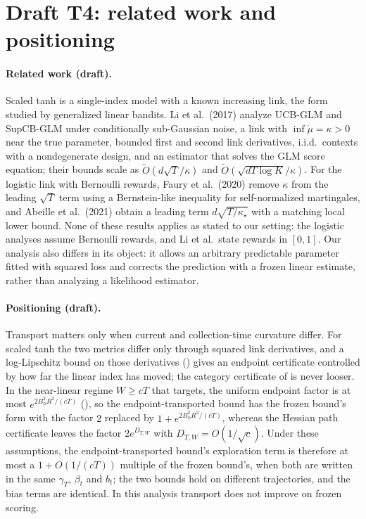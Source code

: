 \section*{Draft T4: related work and positioning}

\paragraph{Related work (draft).}
Scaled tanh is a single-index model with a known increasing link, the form
studied by generalized linear bandits. Li et al.\ (2017) analyze UCB-GLM and
SupCB-GLM under conditionally sub-Gaussian noise, a link with
$\inf\dot\mu=\kappa>0$ near the true parameter, bounded first and second link
derivatives, i.i.d.\ contexts with a nondegenerate design, and an estimator
that solves the GLM score equation; their bounds scale as
$\tilde O(d\sqrt T/\kappa)$ and $\tilde O(\sqrt{dT\log K}/\kappa)$. For the logistic
link with Bernoulli rewards, Faury et al.\ (2020) remove $\kappa$ from the
leading $\sqrt T$ term using a Bernstein-like inequality for self-normalized
martingales, and Abeille et al.\ (2021) obtain a leading term
$d\sqrt{T/\kappa_\star}$ with a matching local lower bound. None of these
results applies as stated to our setting: the logistic analyses assume
Bernoulli rewards, and Li et al.\ state rewards in $[0,1]$. Our
analysis also differs in its object: it allows an arbitrary predictable
parameter fitted with squared loss and corrects the prediction with a frozen
linear estimate, rather than analyzing a likelihood estimator.

\paragraph{Positioning (draft).}
Transport matters only when current and collection-time curvature differ. For
scaled tanh the two metrics differ only through squared link derivatives, and
a log-Lipschitz bound on those derivatives
() gives an endpoint certificate controlled by
how far the linear index has moved; the category certificate of
 is never looser. In the near-linear regime
$W\ge cT$ that  targets, the uniform endpoint
factor is at most $e^{2B_\phi^2R^2/(cT)}$
(), so the endpoint-transported bound has the
frozen bound's form with the factor $2$ replaced by
$1+e^{2B_\phi^2R^2/(cT)}$, whereas the Hessian path certificate leaves the
factor $2e^{D_{T,W}}$ with $D_{T,W}=O(1/\sqrt c)$. Under these assumptions,
the endpoint-transported bound's exploration term is therefore at most a
$1+O(1/(cT))$ multiple of the frozen bound's, when both are written in the
same $\gamma_T$, $\beta_t$ and $b_t$; the two bounds hold on different
trajectories, and the bias terms are identical. In this analysis transport
does not improve on frozen scoring.
